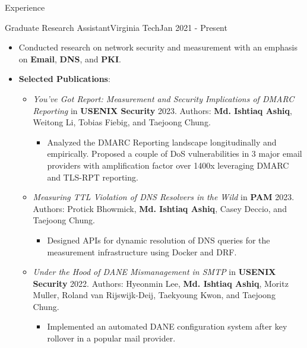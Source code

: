 \documentclass[]{mcdowellcv}
\begin{document}
	\makeheader
	
	\begin{cvsection}{Experience}
		\begin{cvsubsection}{Graduate Research Assistant}{Virginia Tech}{Jan 2021 - Present}
			\begin{itemize}
				\item Conducted research on network security and measurement with an emphasis on \textbf{Email}, \textbf{DNS}, and \textbf{PKI}.
				\item \textbf{Selected Publications}:
				\begin{itemize}
					\item \textit{You’ve Got Report: Measurement and Security Implications of DMARC Reporting} in \textbf{USENIX Security} 2023. Authors: \textbf{Md. Ishtiaq Ashiq}, Weitong Li, Tobias Fiebig, and Taejoong Chung. %
					\begin{itemize}
						\item Analyzed the DMARC Reporting landscape longitudinally and empirically. Proposed a couple of DoS vulnerabilities
						in 3 major email providers with amplification factor over 1400x leveraging DMARC and TLS-RPT reporting.
					\end{itemize}
					\item \textit{Measuring TTL Violation of DNS Resolvers in the Wild} in \textbf{PAM} 2023. Authors: Protick Bhowmick, \textbf{Md. Ishtiaq Ashiq}, Casey Deccio, and Taejoong Chung. %
					\begin{itemize}
						\item Designed APIs for dynamic resolution of DNS queries for the measurement infrastructure using Docker and DRF.
					\end{itemize}
					\item \textit{Under the Hood of DANE Mismanagement in SMTP} in \textbf{USENIX Security} 2022. Authors: Hyeonmin Lee, \textbf{Md. Ishtiaq Ashiq}, Moritz Muller, Roland van Rijswijk-Deij, Taekyoung Kwon, and Taejoong Chung. %
					\begin{itemize}
						\item Implemented an automated DANE configuration system after key rollover in a popular mail provider.
					\end{itemize}
				\end{itemize}
			\end{itemize}
		\end{cvsubsection}
		

\end{cvsection}
\end{document}
